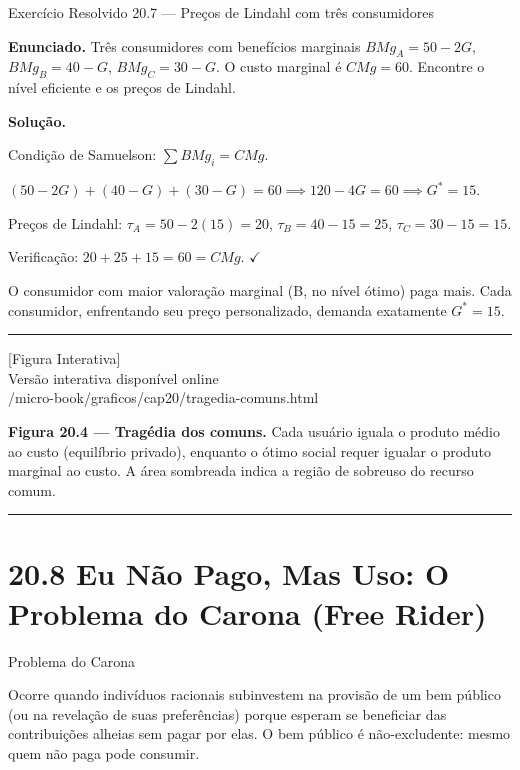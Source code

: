 \documentclass[11pt,twoside,openright]{book}
\newcommand{\figurePlaceholder}[1]{%
  \begin{center}
    \begin{tcolorbox}[
      width=0.85\textwidth,
      colback=graybg,
      colframe=gray,
      boxrule=0.5pt,
      arc=2pt,
      halign=center,
      valign=center,
      height=5cm
    ]
      \centering
      \vfill
      {\sffamily\color{gray}\large [Figura Interativa]}\\[6pt]
      {\sffamily\small\color{gray} Versão interativa disponível online}\\[4pt]
      {\ttfamily\tiny\color{gray} #1}
      \vfill
    \end{tcolorbox}
  \end{center}
}
\begin{document}
\begin{exresolvidobox}{Exercício Resolvido 20.7 — Preços de Lindahl com três consumidores}

\textbf{Enunciado.} Três consumidores com benefícios marginais
\(BMg_A = 50 - 2G\), \(BMg_B = 40 - G\), \(BMg_C = 30 - G\). O custo
marginal é \(CMg = 60\). Encontre o nível eficiente e os preços de
Lindahl.

\textbf{Solução.}

Condição de Samuelson: \(\sum BMg_i = CMg\).

\((50 - 2G) + (40 - G) + (30 - G) = 60 \implies 120 - 4G = 60 \implies G^* = 15\).

Preços de Lindahl: \(\tau_A = 50 - 2(15) = 20\),
\(\tau_B = 40 - 15 = 25\), \(\tau_C = 30 - 15 = 15\).

Verificação: \(20 + 25 + 15 = 60 = CMg\). \(\checkmark\)

O consumidor com maior valoração marginal (B, no nível ótimo) paga mais.
Cada consumidor, enfrentando seu preço personalizado, demanda exatamente
\(G^* = 15\).

\end{exresolvidobox}

\begin{center}\rule{0.5\linewidth}{0.5pt}\end{center}

\figurePlaceholder{/micro-book/graficos/cap20/tragedia-comuns.html}

\textbf{Figura 20.4 --- Tragédia dos comuns.} Cada usuário iguala o
produto médio ao custo (equilíbrio privado), enquanto o ótimo social
requer igualar o produto marginal ao custo. A área sombreada indica a
região de sobreuso do recurso comum.

\begin{center}\rule{0.5\linewidth}{0.5pt}\end{center}

\section{20.8 Eu Não Pago, Mas Uso: O Problema do Carona (Free
Rider)}\label{208}

\begin{definitionbox}{Problema do Carona}

Ocorre quando indivíduos racionais subinvestem na provisão de um bem
público (ou na revelação de suas preferências) porque esperam se
beneficiar das contribuições alheias sem pagar por elas. O bem público é
não-excludente: mesmo quem não paga pode consumir.

\end{definitionbox}
\end{document}
